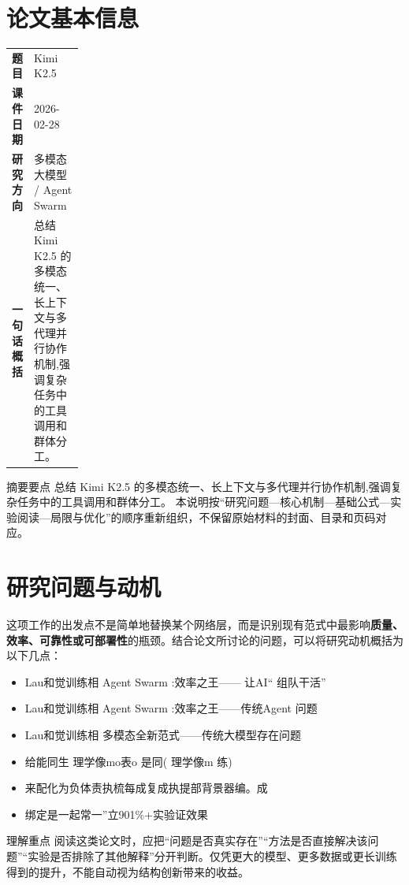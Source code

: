 \documentclass[UTF8,11pt,a4paper]{ctexart}
\newcommand{\term}[1]{\textbf{\textcolor{mainblue}{#1}}}
\begin{document}
\section{论文基本信息}
\begin{center}
\begin{tabularx}{0.94\linewidth}{>{\bfseries}p{0.18\linewidth}X}
\toprule
题目 & Kimi K2.5\\
课件日期 & 2026-02-28\\
研究方向 & 多模态大模型 / Agent Swarm\\
一句话概括 & 总结 Kimi K2.5 的多模态统一、长上下文与多代理并行协作机制,强调复杂任务中的工具调用和群体分工。\\
\bottomrule
\end{tabularx}
\end{center}

\begin{infobox}{摘要要点}
总结 Kimi K2.5 的多模态统一、长上下文与多代理并行协作机制,强调复杂任务中的工具调用和群体分工。 本说明按“研究问题—核心机制—基础公式—实验阅读—局限与优化”的顺序重新组织，不保留原始材料的封面、目录和页码对应。
\end{infobox}

\section{研究问题与动机}
这项工作的出发点不是简单地替换某个网络层，而是识别现有范式中最影响\term{质量、效率、可靠性或可部署性}的瓶颈。结合论文所讨论的问题，可以将研究动机概括为以下几点：
\begin{itemize}
\item Lau和觉训练相 Agent Swarm :效率之王—— 让AI“ 组队干活”
\item Lau和觉训练相 Agent Swarm :效率之王——传统Agent 问题
\item Lau和觉训练相 多模态全新范式——传统大模型存在问题
\item 给能同生 理学像mo表o 是同( 理学像m 练)
\item 来配化为负体责执梳每成复成执提部背景器编。成
\item 绑定是一起常一”立901\%+实验证效果
\end{itemize}

\begin{notebox}{理解重点}
阅读这类论文时，应把“问题是否真实存在”“方法是否直接解决该问题”“实验是否排除了其他解释”分开判断。仅凭更大的模型、更多数据或更长训练得到的提升，不能自动视为结构创新带来的收益。
\end{notebox}
\end{document}
